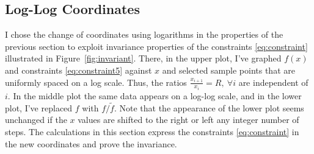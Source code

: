 \documentclass[]{article}
\begin{document}
\subsection{Log-Log Coordinates}
\label{sec:loglog}

I chose the change of coordinates using logarithms in the properties
of the previous section to exploit invariance properties of the
constraints \eqref{eq:constraint} illustrated in
Figure~\ref{fig:invariant}.  There, in the upper plot, I've graphed
$f(x)$ and constraints \eqref{eq:constraint5} against $x$ and selected
sample points that are uniformly spaced on a log scale.  Thus, the
ratios $\frac{x_{i+1}}{x_i} = R,~\forall i$ are independent of $i$.
In the middle plot the same data appears on a log-log scale, and in
the lower plot, I've replaced $f$ with $f/\tilde f$.  Note that the
appearance of the lower plot seems unchanged if the $x$ values are
shifted to the right or left any integer number of steps.  The
calculations in this section express the constraints
\eqref{eq:constraint} in the new coordinates and prove the invariance.

\begin{figure*}
  \centering
    \caption{Upper plot: Segment of nominal isentrope $\pm 20\%$ (an
      exaggerated error range for illustration) on linear scale.
    Middle plot: Same curves on log-log scale.  Lower plot: Same
    curves divided by the nominal on log-log scale.  Note the
    invariance wrt to translation of $x$ for lower plot.}
  \label{fig:invariant}
\end{figure*}
\end{document}
